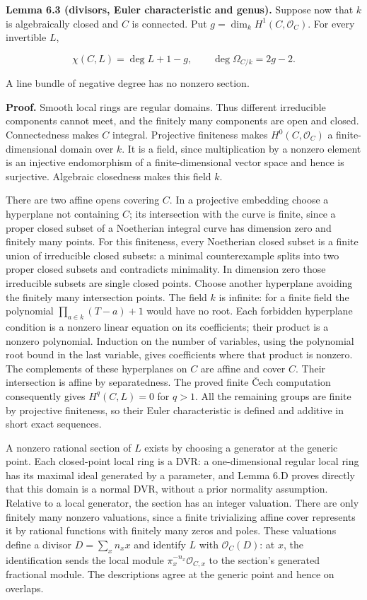 \documentclass[11pt,a4paper,openany]{report}
\begin{document}
\textbf{Lemma 6.3 (divisors, Euler characteristic and genus).} Suppose now that \(k\) is algebraically closed and \(C\) is connected. Put \(g=\dim_k H^1(C,\mathcal O_C)\). For every invertible \(L\),

\[
\chi(C,L)=\deg L+1-g,\qquad
\deg\Omega_{C/k}=2g-2.
\]

A line bundle of negative degree has no nonzero section.

\textbf{Proof.} Smooth local rings are regular domains. Thus different irreducible components cannot meet, and the finitely many components are open and closed. Connectedness makes \(C\) integral. Projective finiteness makes \(H^0(C,\mathcal O_C)\) a finite-dimensional domain over \(k\). It is a field, since multiplication by a nonzero element is an injective endomorphism of a finite-dimensional vector space and hence is surjective. Algebraic closedness makes this field \(k\).

There are two affine opens covering \(C\). In a projective embedding choose a hyperplane not containing \(C\); its intersection with the curve is finite, since a proper closed subset of a Noetherian integral curve has dimension zero and finitely many points. For this finiteness, every Noetherian closed subset is a finite union of irreducible closed subsets: a minimal counterexample splits into two proper closed subsets and contradicts minimality. In dimension zero those irreducible subsets are single closed points. Choose another hyperplane avoiding the finitely many intersection points. The field \(k\) is infinite: for a finite field the polynomial \(\prod_{a\in k}(T-a)+1\) would have no root. Each forbidden hyperplane condition is a nonzero linear equation on its coefficients; their product is a nonzero polynomial. Induction on the number of variables, using the polynomial root bound in the last variable, gives coefficients where that product is nonzero. The complements of these hyperplanes on \(C\) are affine and cover \(C\). Their intersection is affine by separatedness. The proved finite Čech computation consequently gives \(H^q(C,L)=0\) for \(q>1\). All the remaining groups are finite by projective finiteness, so their Euler characteristic is defined and additive in short exact sequences.

A nonzero rational section of \(L\) exists by choosing a generator at the generic point. Each closed-point local ring is a DVR: a one-dimensional regular local ring has its maximal ideal generated by a parameter, and Lemma 6.D proves directly that this domain is a normal DVR, without a prior normality assumption. Relative to a local generator, the section has an integer valuation. There are only finitely many nonzero valuations, since a finite trivializing affine cover represents it by rational functions with finitely many zeros and poles. These valuations define a divisor \(D=\sum_x n_xx\) and identify \(L\) with \(\mathcal O_C(D)\): at \(x\), the identification sends the local module \(\pi_x^{-n_x}\mathcal O_{C,x}\) to the section's generated fractional module. The descriptions agree at the generic point and hence on overlaps.
\end{document}
